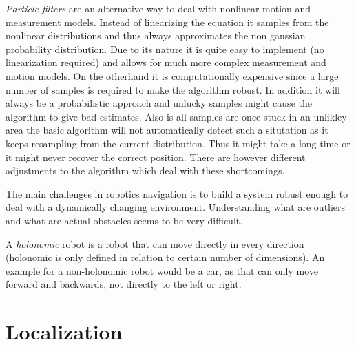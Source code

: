 \documentclass[11pt,a4paper]{article}
\begin{document}
	\emph{Particle filters} are an alternative way to deal with nonlinear motion and measurement models. Instead of linearizing the equation it samples from the nonlinear distributions and thus always approximates the non gaussian probability distribution. Due to its nature it is quite easy to implement (no linearization required) and allows for much more complex measurement and motion models. On the otherhand it is computationally expensive since a large number of samples is required to make the algorithm robust. In addition it will always be a probabilistic approach and unlucky samples might cause the algorithm to give bad estimates. Also is all samples are once stuck in an unlikley area the basic algorithm will not automatically detect such a situtation as it keeps resampling from the current distribution. Thus it might take a long time or it might never recover the correct position. There are however different adjustments to the algorithm which deal with these shortcomings.
	
	The main challenges in robotics navigation is to build a system robust enough to deal with a dynamically changing environment. Understanding what are outliers and what are actual obstacles seems  to be very difficult.
	
	A \emph{holonomic} robot is a robot that can move directly in every direction (holonomic is only defined in relation to certain number of dimensions). An example for a non-holonomic robot would be a car, as that can only move forward and backwards, not directly to the left or right. 
	
	\section{Localization}
\end{document}
